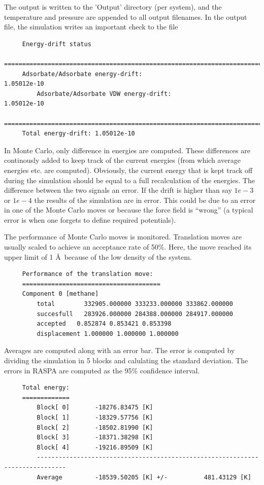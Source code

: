 The output is written to the 'Output' directory (per system), and the temperature and pressure are appended to all output filenames.
In the output file, the simulation writes an important check to the file
\begin{tiny}
\begin{verbatim}
     Energy-drift status
     ===========================================================================
     Adsorbate/Adsorbate energy-drift:                                     1.05012e-10
         Adsorbate/Adsorbate VDW energy-drift:                               1.05012e-10
     ===========================================================================
     Total energy-drift: 1.05012e-10
\end{verbatim}
\end{tiny}
In Monte Carlo, only difference in energies are computed. These differences are continously added to keep track of the current energies
(from which average energies etc. are computed). Obviously, the current energy that is kept track off during the simulation should
be equal to a full recalculation of the energies. The difference between the two signals an error. If the drift is higher than
say $1e-3$ or $1e-4$ the results of the simulation are in error. This could be due to an error in one of the Monte Carlo moves
or because the force field is ``wrong'' (a typical error is when one forgets to define required potentials).

The performance of Monte Carlo moves is monitored. Translation moves are usually scaled to achieve an acceptance rate of 50\%.
Here, the move reached its upper limit of 1 \AA\ because of the low density of the system.
\begin{tiny}
\begin{verbatim}
     Performance of the translation move:
     ======================================
     Component 0 [methane]
         total        332905.000000 333233.000000 333862.000000
         succesfull   283926.000000 284388.000000 284917.000000
         accepted   0.852874 0.853421 0.853398
         displacement 1.000000 1.000000 1.000000
\end{verbatim}
\end{tiny}

Averages are computed along with an error bar. The error is computed by dividing the simulation in 5 blocks and calulating the standard deviation.
The errors in RASPA are computed as the 95\% confidence interval.
\begin{tiny}
\begin{verbatim}
     Total energy:
     =============
         Block[ 0]       -18276.83475 [K]
         Block[ 1]       -18329.57756 [K]
         Block[ 2]       -18502.81990 [K]
         Block[ 3]       -18371.38298 [K]
         Block[ 4]       -19216.89509 [K]
         ------------------------------------------------------------------------------
         Average         -18539.50205 [K] +/-          481.43129 [K]
\end{verbatim}
\end{tiny}

